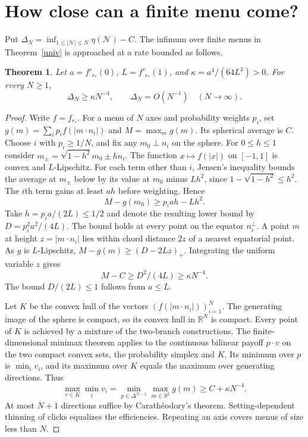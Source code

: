 \documentclass[11pt,a4paper]{article}
\newtheorem{theorem}{Theorem}
\theoremstyle{remark}
\begin{document}
\section{How close can a finite menu come?}

Put \(\Delta_N=\inf_{1\le|\mathcal N|\le N}\eta(\mathcal N)-C\). The infimum over finite menus in Theorem~\ref{univ} is approached at a rate bounded as follows.

\begin{theorem}\label{rate}
Let \(a=f'_{r_*}(0)\), \(L=f'_{r_*}(1)\), and \(\kappa=a^4/(64L^3)>0\). For every \(N\ge1\),
\[
            \Delta_N\ge\kappa N^{-4},\qquad
            \Delta_N=O(N^{-1})\quad(N\to\infty).
\]
\end{theorem}
\begin{proof}
Write \(f=f_{r_*}\). For a menu of \(N\) axes and probability weights \(p_i\), set \(g(m)=\sum_i p_i f(|m\cdot n_i|)\) and \(M=\max_m g(m)\). Its spherical average is \(C\). Choose \(i\) with \(p_i\ge1/N\), and fix any \(m_0\perp n_i\) on the sphere. For \(0\le h\le1\) consider \(m_\pm=\sqrt{1-h^2}m_0\pm h n_i\). The function \(x\mapsto f(|x|)\) on \([-1,1]\) is convex and \(L\)-Lipschitz. For each term other than \(i\), Jensen's inequality bounds the average at \(m_\pm\) below by its value at \(m_0\) minus \(Lh^2\), since \(1-\sqrt{1-h^2}\le h^2\). The \(i\)th term gains at least \(a h\) before weighting. Hence
\[
            M-g(m_0)\ge p_i a h-Lh^2.
\]
Take \(h=p_i a/(2L)\le1/2\) and denote the resulting lower bound by \(D=p_i^2a^2/(4L)\). The bound holds at every point on the equator \(n_i^\perp\). A point \(m\) at height \(z=|m\cdot n_i|\) lies within chord distance \(2z\) of a nearest equatorial point. As \(g\) is \(L\)-Lipschitz, \(M-g(m)\ge(D-2Lz)_+\). Integrating the uniform variable \(z\) gives
\[
           M-C\ge D^2/(4L)\ge\kappa N^{-4}.
\]
The bound \(D/(2L)\le1\) follows from \(a\le L\).

Let \(K\) be the convex hull of the vectors \((f(|m\cdot n_i|))_{i=1}^N\). The generating image of the sphere is compact, so its convex hull in \(\mathbb R^N\) is compact. Every point of \(K\) is achieved by a mixture of the two-branch constructions. The finite-dimensional minimax theorem applies to the continuous bilinear payoff \(p\cdot v\) on the two compact convex sets, the probability simplex and \(K\). Its minimum over \(p\) is \(\min_i v_i\), and its maximum over \(K\) equals the maximum over generating directions. Thus
\[
       \max_{v\in K}\min_i v_i
       =\min_{p\in\Delta^{N-1}}\max_{m\in S^2}g(m)
       \ge C+\kappa N^{-4}.
\]
At most \(N+1\) directions suffice by Carath\'eodory's theorem. Setting-dependent thinning of clicks equalizes the efficiencies. Repeating an axis covers menus of size less than \(N\).


\end{proof}
\end{document}
